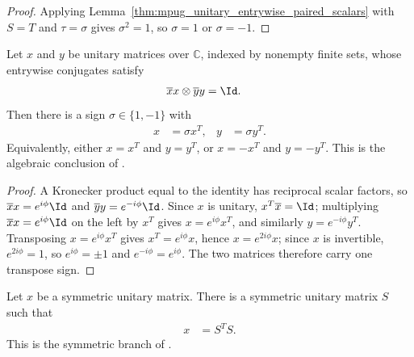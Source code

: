 \begin{proof}\leanok
    Applying Lemma~\ref{thm:mpug_unitary_entrywise_paired_scalars} with $S=T$
    and $\tau=\sigma$ gives $\sigma^2=1$, so
    $\sigma=1$ or $\sigma=-1$.
\end{proof}

\begin{lemma}
    \label{thm:mpu_conjugation_common_transpose_sign}
    \leanok
    Let $x$ and $y$ be unitary matrices over $\mathbb C$, indexed by nonempty
    finite sets, whose entrywise conjugates satisfy
    \begin{align}
        \overline xx\otimes\overline yy & =\Id.
    \end{align}
    Then there is a sign $\sigma\in\{1,-1\}$ with
    \begin{align}
        x & =\sigma x^T, & y & =\sigma y^T.
    \end{align}
    Equivalently, either $x=x^T$ and $y=y^T$, or $x=-x^T$ and $y=-y^T$.
    This is the algebraic conclusion of \cite[lines~1033--1038]{Cirac2017MPU}.
\end{lemma}

\begin{proof}\leanok
    A Kronecker product equal to the identity has reciprocal scalar factors, so
    $\overline xx=e^{i\phi}\Id$ and $\overline yy=e^{-i\phi}\Id$. Since $x$ is
    unitary, $x^T\overline x=\Id$; multiplying $\overline xx=e^{i\phi}\Id$ on
    the left by $x^T$ gives $x=e^{i\phi}x^T$, and similarly
    $y=e^{-i\phi}y^T$. Transposing $x=e^{i\phi}x^T$ gives $x^T=e^{i\phi}x$,
    hence $x=e^{2i\phi}x$; since $x$ is invertible, $e^{2i\phi}=1$, so
    $e^{i\phi}=\pm1$ and $e^{-i\phi}=e^{i\phi}$. The two matrices therefore
    carry one transpose sign.
\end{proof}

\begin{lemma}
    \label{lem:mpu_symmetric_unitary_congruence}
    \leanok
    Let $x$ be a symmetric unitary matrix. There is a symmetric unitary matrix
    $S$ such that
    \begin{align}
        x & = S^T S.
    \end{align}
    This is the symmetric branch of
    \cite[Lemma~\texttt{lemma:conjclass-normalform-continuous}]{Cirac2017MPU}.
\end{lemma}

